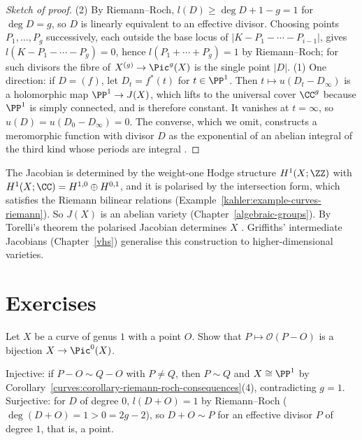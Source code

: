 \begin{proof}[Sketch of proof]
(2) By Riemann--Roch, $l(D) \geq \deg D + 1 - g = 1$ for $\deg D = g$, so $D$ is linearly equivalent to an effective divisor. Choosing points $P_1, \ldots, P_g$ successively,
each outside the base locus of $|K - P_1 - \cdots - P_{i-1}|$, gives $l(K - P_1 - \cdots - P_g) = 0$, hence $l(P_1 + \cdots + P_g) = 1$ by Riemann--Roch; for such divisors the fibre
of $X^{(g)} \to \Pic^g(X)$ is the single point $|D|$. (1) One direction: if $D = (f)$, let $D_t = f^*(t)$ for $t \in \PP^1$. Then $t \mapsto u(D_t - D_\infty)$ is a holomorphic map
$\PP^1 \to J(X)$, which lifts to the universal cover $\CC^g$ because $\PP^1$ is simply connected, and is therefore constant. It vanishes at $t = \infty$, so
$u(D) = u(D_0 - D_\infty) = 0$. The converse, which we omit, constructs a meromorphic function with divisor $D$ as the exponential of an abelian integral of the third kind whose
periods are integral \cite[Chapter 2, Section 2]{griffiths-harris}.
\end{proof}

\begin{remark}\label{curves:remark-jacobian-hodge}
The Jacobian is determined by the weight-one Hodge structure $H^1(X; \ZZ)$ with $H^1(X; \CC) = H^{1,0} \oplus H^{0,1}$, and it is polarised by the intersection form, which satisfies the
Riemann bilinear relations (Example~\ref{kahler:example-curves-riemann}). So $J(X)$ is an abelian variety (Chapter~\ref{algebraic-groups}). By Torelli's
theorem the polarised Jacobian determines $X$ \cite[Chapter 2, Section 7]{griffiths-harris}. Griffiths' intermediate Jacobians (Chapter~\ref{vhs}) generalise
this construction to higher-dimensional varieties.
\end{remark}

\section{Exercises}\label{curves:section-exercises}

\begin{exercise}\label{curves:exercise-elliptic-group}
Let $X$ be a curve of genus $1$ with a point $O$. Show that $P \mapsto \mathcal{O}(P - O)$ is a bijection $X \to \Pic^0(X)$.
\end{exercise}

\begin{solution}
Injective: if $P - O \sim Q - O$ with $P \neq Q$, then $P \sim Q$ and $X \cong \PP^1$ by Corollary~\ref{curves:corollary-riemann-roch-consequences}(4), contradicting $g = 1$. Surjective:
for $D$ of degree $0$, $l(D + O) = 1$ by Riemann--Roch ($\deg(D + O) = 1 > 0 = 2g - 2$), so $D + O \sim P$ for an effective divisor $P$ of degree $1$, that is, a point.
\end{solution}

